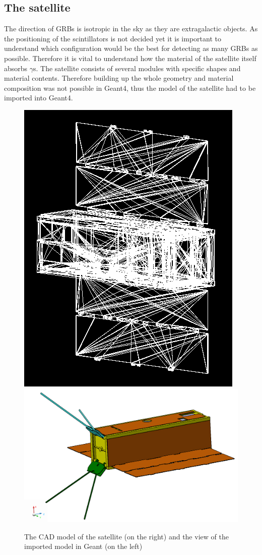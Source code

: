 \documentclass[12pt, a4paper,titlepage]{article}
\numberwithin{equation}{section}
\numberwithin{figure}{section}
\begin{document}
\pagebreak

\subsection{The satellite}

The direction of GRBs is isotropic in the sky as they are extragalactic objects. As the positioning of the scintillators is not decided yet it is important to understand which configuration would be the best for detecting as many GRBs as possible. Therefore it is vital to understand how the material of the satellite itself absorbs $\gamma$s. The satellite consists of several modules with specific shapes and material contents. Therefore building up the whole geometry and material composition was not possible in Geant4, thus the model of the satellite had to be  imported into Geant4.

\begin{figure}[h!]
 \centering %
 \includegraphics[width=.35\textwidth,origin=c,angle=0]{images/satellite.png}
 \qquad
 \includegraphics[width=.5\textwidth,origin=c,angle=90]{images/cad_sat.png} 
 \caption{\label{fig:i} The CAD model of the satellite (on the right) and the view of the imported model in Geant (on the left)}
 \end{figure}
\end{document}
